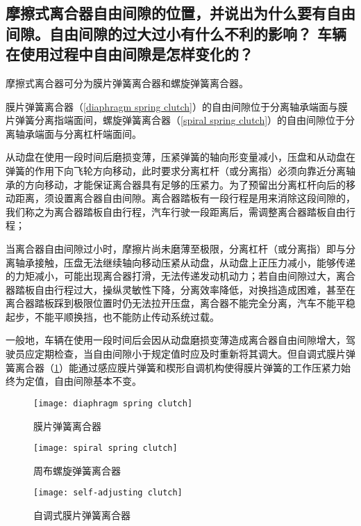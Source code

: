 \documentclass[UTF8]{ctexart}
\numberwithin{figure}{section}
\numberwithin{table}{section}
\begin{document}
\subsection{摩擦式离合器自由间隙的位置，并说出为什么要有自由间隙。自由间隙的过大过小有什么不利的影响？ 车辆在使用过程中自由间隙是怎样变化的？}

摩擦式离合器可分为膜片弹簧离合器和螺旋弹簧离合器。

膜片弹簧离合器（\cref{diaphragm spring clutch}）的自由间隙位于分离轴承端面与膜片弹簧分离指端面间，螺旋弹簧离合器（\cref{spiral spring clutch}）的自由间隙位于分离轴承端面与分离杠杆端面间。

从动盘在使用一段时间后磨损变薄，压紧弹簧的轴向形变量减小，压盘和从动盘在弹簧的作用下向飞轮方向移动，此时要求分离杠杆（或分离指）必须向靠近分离轴承的方向移动，才能保证离合器具有足够的压紧力。为了预留出分离杠杆向后的移动距离，须设置离合器自由间隙。离合器踏板有一段行程是用来消除这段间隙的，我们称之为离合器踏板自由行程，汽车行驶一段距离后，需调整离合器踏板自由行程；

当离合器自由间隙过小时，摩擦片尚未磨薄至极限，分离杠杆（或分离指）即与分离轴承接触，压盘无法继续轴向移动压紧从动盘，从动盘上正压力减小，能够传递的力矩减小，可能出现离合器打滑，无法传递发动机动力；若自由间隙过大，离合器踏板自由行程过大，操纵灵敏性下降，分离效率降低，对换挡造成困难，甚至在离合器踏板踩到极限位置时仍无法拉开压盘，离合器不能完全分离，汽车不能平稳起步，不能平顺换挡，也不能防止传动系统过载。

一般地，车辆在使用一段时间后会因从动盘磨损变薄造成离合器自由间隙增大，驾驶员应定期检查，当自由间隙小于规定值时应及时重新将其调大。但自调式膜片弹簧离合器（\cref{self-adjusting clutch}）能通过感应膜片弹簧和楔形自调机构使得膜片弹簧的工作压紧力始终为定值，自由间隙基本不变。

\begin{figure}[htbp]
	\centering
	\begin{minipage}[b]{0.5\textwidth}
		\centering
		\texttt{[image: diaphragm spring clutch]}
		\caption{膜片弹簧离合器}
		\label{diaphragm spring clutch}
	\end{minipage}
	\begin{minipage}[b]{0.4\textwidth}
		\centering
		\texttt{[image: spiral spring clutch]}
		\caption{周布螺旋弹簧离合器}
		\label{spiral spring clutch}
	\end{minipage}
	\begin{minipage}[b]{0.5\textwidth}
		\centering
		\texttt{[image: self-adjusting clutch]}
		\caption{自调式膜片弹簧离合器}
		\label{self-adjusting clutch}
	\end{minipage}
\end{figure}
\end{document}
